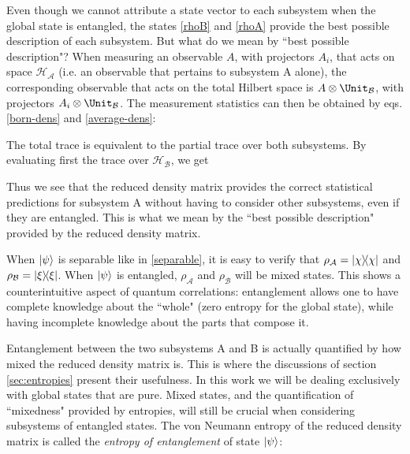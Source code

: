 \documentclass[12pt,a4paper,notitlepage]{report}
\begin{document}
Even though we cannot attribute a state vector to each subsystem when the global state is entangled, the states \eqref{rhoB} and \eqref{rhoA} provide the best possible description of each subsystem. But what do we mean by ``best possible description"? When measuring an observable $A$, with projectors $A_i$, that acts on space $\mathcal{H}_\mathcal{A}$ (i.e. an observable that pertains to subsystem A alone), the corresponding observable that acts on the total Hilbert space is $A\otimes\Unit_\mathcal{B}$, with projectors $A_i\otimes\Unit_\mathcal{B}$. The measurement statistics can then be obtained by eqs. \eqref{born-dens} and \eqref{average-dens}:

%
The total trace is equivalent to the partial trace over both subsystems. By evaluating first the trace over $\mathcal{H}_\mathcal{B}$, we get

%
Thus we see that the reduced density matrix provides the correct statistical predictions for subsystem A without having to consider other subsystems, even if they are entangled. This is what we mean by the ``best possible description" provided by the reduced density matrix.

When $\ket{\psi}$ is separable like in \eqref{separable}, it is easy to verify that $\rho_\mathcal{A} = \dyad{\chi}$ and $\rho_\mathcal{B} = \dyad{\xi}$. When $\ket{\psi}$ is entangled, $\rho_\mathcal{A}$ and $\rho_\mathcal{B}$ will be mixed states. This shows a counterintuitive aspect of quantum correlations: entanglement allows one to have complete knowledge about the ``whole" (zero entropy for the global state), while having incomplete knowledge about the parts that compose it.

Entanglement between the two subsystems A and B is actually quantified by how mixed the reduced density matrix is. This is where the discussions of section \ref{sec:entropies} present their usefulness. In this work we will be dealing exclusively with global states that are pure. Mixed states, and the quantification of ``mixedness" provided by entropies, will still be crucial when considering subsystems of entangled states. The von Neumann entropy of the reduced density matrix is called the {\it entropy of entanglement} of state $\ket{\psi}$:
\end{document}
